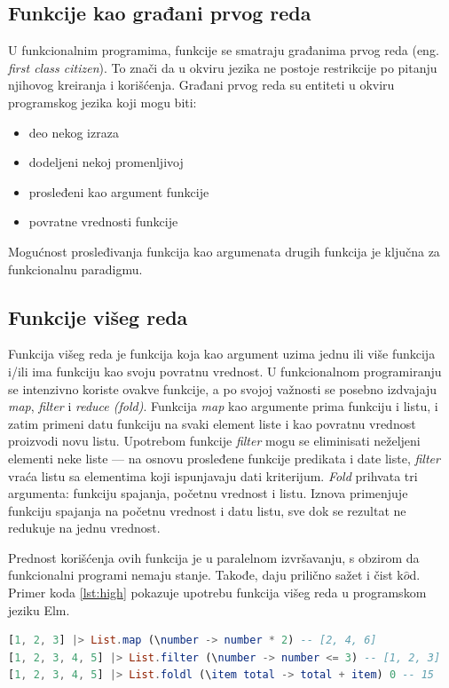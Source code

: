 \documentclass[12pt,oneside]{memoir}
\begin{document}
\subsection{Funkcije kao građani prvog reda}
U funkcionalnim programima, funkcije se smatraju građanima prvog reda (eng. \emph{first class citizen}). To znači da u okviru jezika ne postoje restrikcije po pitanju njihovog kreiranja i korišćenja. Građani prvog reda su entiteti u okviru programskog jezika koji mogu biti:
\begin{itemize}
\item deo nekog izraza
\item dodeljeni nekoj promenljivoj
\item prosleđeni kao argument funkcije
\item povratne vrednosti funkcije
\end{itemize}
Mogućnost prosleđivanja funkcija kao argumenata drugih funkcija je ključna za funkcionalnu paradigmu. 

\subsection{Funkcije višeg reda}
Funkcija višeg reda je funkcija koja kao argument uzima jednu ili više funkcija i/ili ima funkciju kao svoju povratnu vrednost. U funkcionalnom programiranju se intenzivno koriste ovakve funkcije, a po svojoj važnosti se posebno izdvajaju \textit{map}, \textit{filter} i \textit{reduce (fold)}.  Funkcija \textit{map} kao argumente prima funkciju i listu, i zatim primeni datu funkciju na svaki element liste i kao povratnu vrednost proizvodi novu listu. Upotrebom funkcije \textit{filter} mogu se eliminisati neželjeni elementi neke liste --- na osnovu prosleđene funkcije predikata i date liste, \textit{filter} vraća listu sa elementima koji ispunjavaju dati kriterijum. \textit{Fold} prihvata tri argumenta: funkciju spajanja, početnu vrednost i listu. Iznova primenjuje funkciju spajanja na početnu vrednost i datu listu, sve dok se rezultat ne redukuje na jednu vrednost. 
\par Prednost korišćenja ovih funkcija je u paralelnom izvršavanju, s obzirom da funkcionalni programi nemaju stanje. Takođe, daju prilično sažet i čist k$\hat{o}$d. Primer koda \ref{lst:high} pokazuje upotrebu funkcija višeg reda u programskom jeziku Elm.

\begin{lstlisting}[language=elm, caption={Funkcije višeg reda},captionpos=b, label={lst:high}]
[1, 2, 3] |> List.map (\number -> number * 2) -- [2, 4, 6]
[1, 2, 3, 4, 5] |> List.filter (\number -> number <= 3) -- [1, 2, 3]
[1, 2, 3, 4, 5] |> List.foldl (\item total -> total + item) 0 -- 15
\end{lstlisting}
\end{document}
